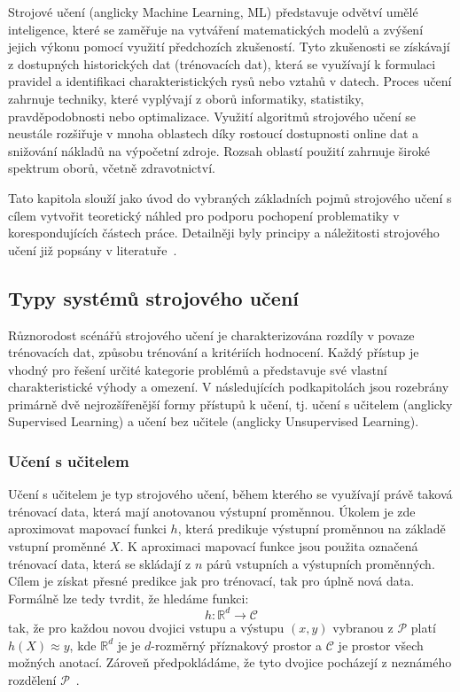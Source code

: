 Strojové učení (anglicky Machine Learning, \gls{ML}) představuje odvětví umělé
inteligence, které se zaměřuje na vytváření matematických modelů a zvýšení
jejich výkonu pomocí využití předchozích zkušeností. Tyto zkušenosti se
získávají z dostupných historických dat (trénovacích dat), která se využívají k
formulaci pravidel a identifikaci charakteristických rysů nebo vztahů v datech.
Proces učení zahrnuje techniky, které vyplývají z  oborů informatiky,
statistiky, pravděpodobnosti nebo optimalizace. Využití algoritmů strojového
učení se neustále rozšiřuje v mnoha oblastech díky rostoucí dostupnosti online
dat a snižování nákladů na výpočetní zdroje. Rozsah oblastí použití zahrnuje
široké spektrum oborů, včetně zdravotnictví.

Tato kapitola slouží jako úvod do vybraných základních pojmů strojového učení s
cílem vytvořit teoretický náhled pro podporu pochopení problematiky v
korespondujících částech práce. Detailněji byly principy a náležitosti
strojového učení již popsány v
literatuře~\cite{Aurelien2022,Murphy2012,Goodfellow2016}.

\subsection{Typy systémů strojového učení}
Různorodost scénářů strojového učení je charakterizována rozdíly v povaze
trénovacích dat, způsobu trénování a kritériích hodnocení. Každý přístup je
vhodný pro řešení určité kategorie problémů a představuje své vlastní
charakteristické výhody a omezení. V následujících podkapitolách jsou rozebrány
primárně dvě nejrozšířenější formy přístupů k učení, tj. učení s učitelem
(anglicky Supervised Learning) a učení bez učitele (anglicky Unsupervised
Learning).

\subsubsection{Učení s učitelem}
\label{subsubsec:supervised_learning}
Učení s učitelem je typ strojového učení, během kterého se využívají právě
taková trénovací data, která mají anotovanou výstupní proměnnou. Úkolem je zde
aproximovat mapovací funkci $h$, která predikuje výstupní proměnnou na základě
vstupní proměnné $X$. K aproximaci mapovací funkce jsou použita označená
trénovací data, která se skládají z $n$ párů vstupních a výstupních proměnných.
Cílem je získat přesné predikce jak pro trénovací, tak pro úplně nová data.
Formálně lze tedy tvrdit, že hledáme funkci:
\begin{equation}
    h:\mathbb{R}^d \rightarrow \mathcal{C}
\end{equation}
tak, že pro každou novou dvojici vstupu a výstupu $(x,y)$ vybranou z
$\mathcal{P}$ platí $h(X) ≈ y$, kde $\mathbb{R}^d$ je je $d$-rozměrný příznakový
prostor a $\mathcal{C}$ je prostor všech možných anotací. Zároveň předpokládáme,
že tyto dvojice pocházejí z neznámého rozdělení
$\mathcal{P}$~\cite{Murphy2012}.

